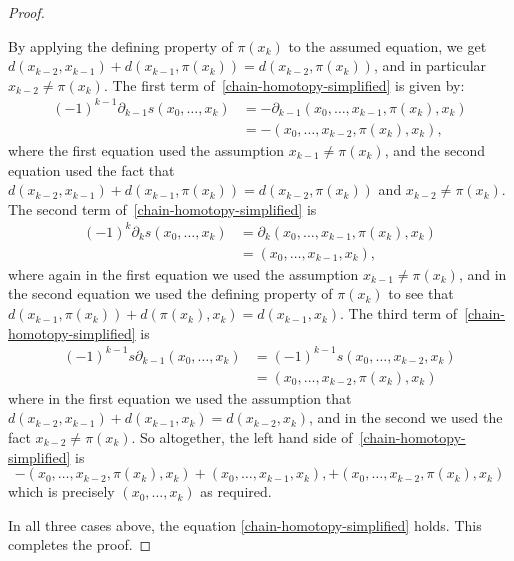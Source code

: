 \documentclass[a4paper, 11 pt, oneside, reqno]{amsart}
\numberwithin{lemma}{section}
\theoremstyle{definition}
\begin{document}
\begin{proof}
\begin{itemize}
        By applying the defining property of $\pi(x_k)$ to
        the assumed equation, we get
        $d(x_{k-2},x_{k-1})+d(x_{k-1},\pi(x_k)) 
        = d(x_{k-2},\pi(x_k))$,
        and in particular $x_{k-2}\neq \pi(x_k)$.
        The first term of~\eqref{chain-homotopy-simplified}
        is given by:
        \begin{align*}
    	(-1)^{k-1}\partial_{k-1}s(x_0,\ldots,x_k)
            &=
    	-\partial_{k-1}(x_0,\ldots,x_{k-1},\pi(x_k),x_k)
            \\
            &=
            -(x_0,\ldots,x_{k-2},\pi(x_k),x_k),
        \end{align*}
        where the first equation used the assumption
        $x_{k-1}\neq\pi(x_k)$, 
        and the second equation used the fact that
        $d(x_{k-2},x_{k-1})+d(x_{k-1},\pi(x_k))
        = d(x_{k-2},\pi(x_k))$ and $x_{k-2}\neq\pi(x_k)$.
        The second term of~\eqref{chain-homotopy-simplified} is 
        \begin{align*}
    	(-1)^k \partial_k s(x_0,\ldots,x_k)
            &=
            \partial_k (x_0,\ldots,x_{k-1},\pi(x_k),x_k)
            \\
            &=
    	(x_0,\ldots,x_{k-1},x_k),
        \end{align*}
        where again in the first equation we used the assumption
        $x_{k-1}\neq\pi(x_k)$, and in the second equation
        we used the defining property of 
        $\pi(x_k)$ to see that
        $d(x_{k-1},\pi(x_k))+d(\pi(x_k),x_k) = d(x_{k-1},x_k)$.
        The third term of~\eqref{chain-homotopy-simplified} is  
        \begin{align*}
    	(-1)^{k-1}s\partial_{k-1}(x_0,\ldots,x_k)
            &=
    	(-1)^{k-1}s(x_0,\ldots,x_{k-2},x_k)
            \\
            &=
    	(x_0,\ldots,x_{k-2},\pi(x_k),x_k)
        \end{align*} 
        where in the first equation we used the assumption
        that
        $d(x_{k-2},x_{k-1})+d(x_{k-1},x_k) = d(x_{k-2},x_k)$,
        and in the second we used the fact $x_{k-2}\neq\pi(x_k)$.
        So altogether, the left hand side 
        of~\eqref{chain-homotopy-simplified} is
        \[
            -(x_0,\ldots,x_{k-2},\pi(x_k),x_k)
            +
    	(x_0,\ldots,x_{k-1},x_k),
            +
    	(x_0,\ldots,x_{k-2},\pi(x_k),x_k)
        \]
        which is precisely $(x_0,\ldots,x_k)$ as required.
    \end{itemize}
    In all three cases above, the equation
    \eqref{chain-homotopy-simplified} holds.
    This completes the proof.
\end{proof}
\end{document}
